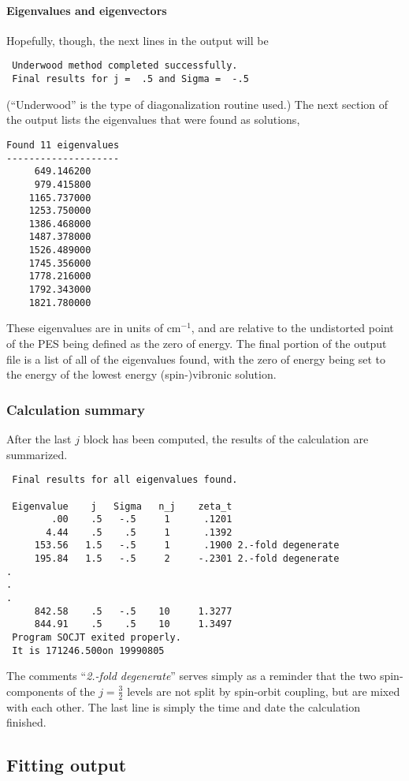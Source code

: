 \documentclass{article}
\newcommand{\wn}{cm$^{-1}$}
\begin{document}
\paragraph{Eigenvalues and eigenvectors}
Hopefully, though, the next lines in the output will be
\begin{verbatim}
 Underwood method completed successfully.
 Final results for j =  .5 and Sigma =  -.5
\end{verbatim}
(``Underwood'' is the type of diagonalization routine used.) The next
section of the output lists the eigenvalues that were found as
solutions,
\begin{verbatim}
Found 11 eigenvalues
--------------------
     649.146200
     979.415800
    1165.737000
    1253.750000
    1386.468000
    1487.378000
    1526.489000
    1745.356000
    1778.216000
    1792.343000
    1821.780000
\end{verbatim}
These eigenvalues are in units of \wn , and are relative to the
undistorted point of the PES being defined as the zero of energy. The
final portion of the output file is a list of all of the eigenvalues
found, with the zero of energy being set to the energy of the lowest
energy (spin-)vibronic solution.


\subsubsection{Calculation summary}
After the last $j$ block has been computed, the results of the
calculation are summarized.
\begin{verbatim} 
 Final results for all eigenvalues found.
 
 Eigenvalue    j   Sigma   n_j    zeta_t
        .00    .5   -.5     1      .1201
       4.44    .5    .5     1      .1392
     153.56   1.5   -.5     1      .1900 2.-fold degenerate
     195.84   1.5   -.5     2     -.2301 2.-fold degenerate
.
.
.
     842.58    .5   -.5    10     1.3277
     844.91    .5    .5    10     1.3497
 Program SOCJT exited properly.
 It is 171246.500on 19990805
\end{verbatim}
The comments ``{\it 2.-fold degenerate}'' serves simply as a reminder
that the two spin-components of the $j=\frac{3}{2}$ levels are not
split by spin-orbit coupling, but are mixed with each other.
The last line is simply the time and date the calculation finished.

\subsection{Fitting output}
\end{document}
